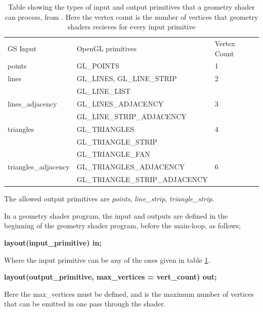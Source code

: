 \documentclass[a4paper, 12pt]{article}
\newcommand{\headcol}{\rowcolor{tableheadcolor}} %
\newcommand{\rowcol}{\rowcolor{tablerowcolor}} %
\begin{document}
\begin{table}
\centering
\caption{Table showing the types of input and output primitives that a geometry shader can process, from \cite{GEOM}. Here the vertex count is the number of vertices that geometry shaders recieves for every input primitive }
\label{tab:GSprimitives}
\begin{tabular}{lll} \toprule
GS Input & OpenGL primitives & Vertex Count \\\headcol \midrule
\headcol points& GL\_POINTS​&1\\
\rowcol lines& GL\_LINES​, GL\_LINE\_STRIP​​&2\\
\rowcol &  GL\_LINE\_LIST&\\
\headcol lines\_adjacency&GL\_LINES\_ADJACENCY​&​3\\
\headcol & GL\_LINE\_STRIP\_ADJACENCY&\\
\rowcol triangles&GL\_TRIANGLES​​&4\\
\rowcol & GL\_TRIANGLE\_STRIP​&\\
\rowcol &GL\_TRIANGLE\_FAN&\\
\headcol triangles\_adjacency&GL\_TRIANGLES\_ADJACENCY​​&6\\
\headcol & GL\_TRIANGLE\_STRIP\_ADJACENCY&\\\midrule
\end{tabular}
\end{table}

The allowed output primitives are \emph{points}, \emph{line\_strip}, \emph{triangle\_strip}.

In a geometry shader program, the input and outputs are defined in the beginning of the geometry shader program, before the main-loop, as follows;
\begin{center}
\textbf{layout(input\_primitive​) in;}
\end{center}
Where the input primitive can be any of the ones given in table \ref{tab:GSprimitives}. 
\begin{center}
\textbf{layout(output\_primitive​, max\_vertices = vert\_count​) out;}
\end{center}
Here the max\_vertices must be defined, and is the maximum number of vertices that can be emitted in one pass through the shader.
\end{document}
